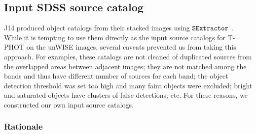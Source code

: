 \documentclass[apj,iop]{emulateapj}
\begin{document}

\subsection{Input SDSS source catalog} 
J14 produced object catalogs from their stacked images using $\tt SExtractor$ \citep[][]{Bertin1996}. While it is tempting to use them directly as the input source catalogs for T-PHOT on the unWISE images, several caveats prevented us from taking this approach. For examples, these catalogs are not cleaned of duplicated sources from the overlapped areas between adjacent images; they are not matched among the bands and thus have different number of sources for each band; the object detection threshold was set too high and many faint objects were excluded; bright and saturated objects have clusters of false detections; etc. For these reasons, we constructed our own input source catalogs.

\subsubsection{Rationale}
\end{document}
